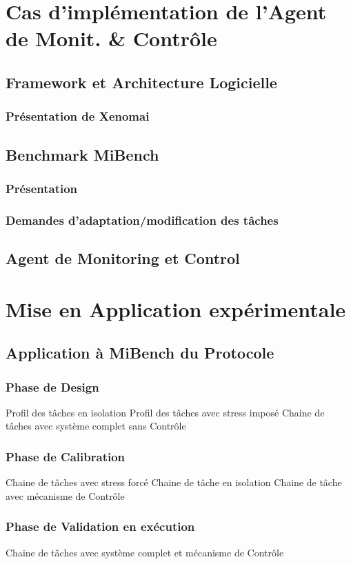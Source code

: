 \documentclass[french, a4paper, 11pt, twoside]{StyleThese}
\begin{document}
\chapter{Cas d'implémentation de l'Agent de Monit. & Contrôle}
    \section{Framework et Architecture Logicielle}
        \subsection{Présentation de Xenomai}
    \section{Benchmark MiBench}
        \subsection{Présentation}
        \subsection{Demandes d'adaptation/modification des tâches}
    \section{Agent de Monitoring et Control}
\chapter{Mise en Application expérimentale}
    \section{Application à MiBench du Protocole}
        \subsection{Phase de Design}
            Profil des tâches en isolation
            Profil des tâches avec stress imposé
            Chaine de tâches avec système complet sans Contrôle
        \subsection{Phase de Calibration}
            Chaine de tâches avec stress forcé
            Chaine de tâche en isolation
            Chaine de tâche avec mécanisme de Contrôle
        \subsection{Phase de Validation en exécution}
            Chaine de tâches avec système complet et mécanisme de Contrôle
\end{document}

